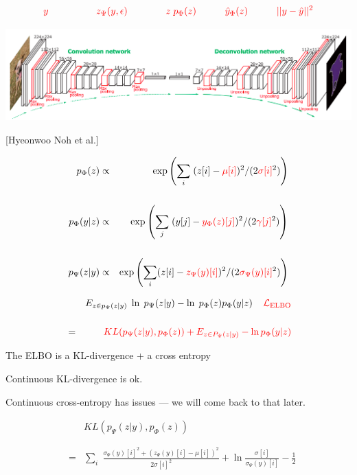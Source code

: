 {\vfill
$${\color{red}y \hspace{5em}  z_\Psi(y,\epsilon) \hspace{4em} z\;p_\Phi(z) \hspace{3em} \hat{y}_\Phi(z) \hspace{3em}||y - \hat{y}||^2}$$
\centerline{\includegraphics[width=9in]{../images/Deconv}}

\centerline{\Large [Hyeonwoo Noh et al.]}


\begin{eqnarray*}
p_\Phi(z) & \propto & \exp\left(\sum_i \;(z[i] - {\color{red} \mu[i]})^2/(2{\color{red} \sigma[i]}^2)\right) \\
\\
p_\Phi(y|z) & \propto & \exp\left(\sum_j\;(y[j] - {\color{red} y_\Phi(z)[j]})^2/(2{\color{red} \gamma[j]}^2)\right) \\
\\
p_\Psi(z|y) & \propto & \exp\left(\sum_i (z[i] - {\color{red} z_\Psi(y)[i]})^2/(2{\color{red} \sigma_\Psi(y)[i]}^2)\right)
\end{eqnarray*}


\begin{eqnarray*}
&  & E_{z \in p_\Psi(z|y)}\;\ln\;p_\Psi(z|y) - \ln\;p_\Phi(z)p_\Phi(y|z) \;\;\;\;{\color{red} {\cal L}_{\mathrm{ELBO}}} \\
\\
& = & {\color{red}  KL(p_\Psi(z|y),p_\Phi(z)) + E_{z \in P_\Psi(z|y)} - \ln p_\Phi(y|z)}
\end{eqnarray*}

\vfill
The ELBO is a KL-divergence + a cross entropy

\vfill
Continuous KL-divergence is ok.

\vfill
Continuous cross-entropy has issues --- we will come back to that
later.


\begin{eqnarray*}
& & KL(p_\Psi(z|y),p_\Phi(z)) \\
\\
\\
& = & \sum_i \;\frac{\sigma_\Psi(y)[i]^2 + (z_\Psi(y)[i]-\mu[i])^2}{2 \sigma[i]^2}
+ \ln\frac{\sigma[i]}{\sigma_\Psi(y)[i]} - \frac{1}{2}
\end{eqnarray*}


}
